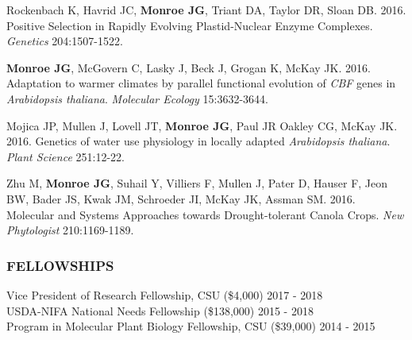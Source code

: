 \documentclass[12pt,english]{article}
\begin{document}
\begin{hangparas}{.5in}{1}

\hspace{1em} Rockenbach K, Havrid JC, \textbf{Monroe JG}, Triant DA, Taylor DR, Sloan DB. 2016. Positive Selection in Rapidly Evolving Plastid-Nuclear Enzyme Complexes. \textit{Genetics} 204:1507-1522.
\vspace{1ex}\par
\hspace{1em} \textbf{Monroe JG}, McGovern C, Lasky J, Beck J, Grogan K, McKay JK. 2016. Adaptation to warmer climates by parallel functional evolution of \textit{CBF} genes in \textit{Arabidopsis thaliana}. \textit{Molecular Ecology} 15:3632-3644.
\vspace{1ex}\par
\hspace{1em} Mojica JP, Mullen J, Lovell JT, \textbf{Monroe JG}, Paul JR Oakley CG, McKay JK. 2016. Genetics of water use physiology in locally adapted \textit{Arabidopsis thaliana}. \textit{Plant Science}  251:12-22.
\vspace{1ex}\par
\hspace{1em} Zhu M, \textbf{Monroe JG}, Suhail Y, Villiers F, Mullen J, Pater D, Hauser F, Jeon BW, Bader JS, Kwak JM, Schroeder JI, McKay JK, Assman SM. 2016. Molecular and Systems Approaches towards Drought-tolerant Canola Crops. \textit{New Phytologist} 210:1169-1189.
\end{hangparas}
\vspace{1ex}


\subsubsection*{FELLOWSHIPS}
\vspace{-0.5ex}
\hspace*{1.0em} Vice President of Research Fellowship, CSU (\$4,000)
\hfill 
2017 - 2018
\vspace{1ex}\\
\hspace*{1.0em} USDA-NIFA National Needs Fellowship (\$138,000)
\hfill 
2015 - 2018
\vspace{1ex}\\
\hspace*{1.0em} Program in Molecular Plant Biology Fellowship, CSU (\$39,000)
\hfill 
2014 - 2015
\vspace{1ex}
\end{document}
